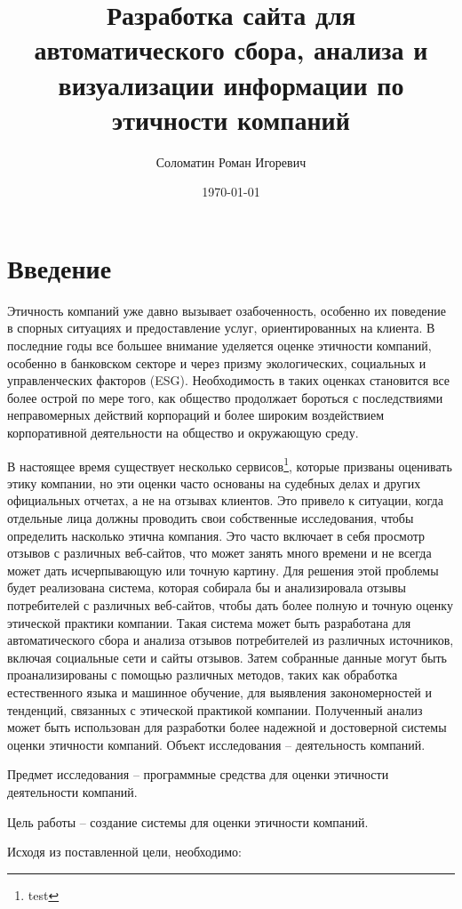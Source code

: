 \documentclass[PI, VKR]{HSEUniversity}
\author{Соломатин Роман Игоревич}
\date{\today}
\title{Разработка сайта для автоматического сбора, анализа и визуализации информации по этичности компаний}
\begin{document}
\maketitle

\chapter*{Введение}
\label{sec:org5986b54}
Этичность компаний уже давно вызывает озабоченность, особенно их поведение в спорных ситуациях и предоставление услуг, ориентированных на клиента. В последние годы все большее внимание уделяется оценке этичности компаний\autocite{mure_esg_2021}, особенно в банковском секторе и через призму экологических, социальных и управленческих факторов (ESG). Необходимость в таких оценках становится все более острой по мере того, как общество продолжает бороться с последствиями неправомерных действий корпораций и более широким воздействием корпоративной деятельности на общество и окружающую среду.

В настоящее время существует несколько сервисов\footnote{test}, которые призваны оценивать этику компании, но эти оценки часто основаны на судебных делах и других официальных отчетах, а не на отзывах клиентов. Это привело к ситуации, когда отдельные лица должны проводить свои собственные исследования, чтобы определить насколько этична компания. Это часто включает в себя просмотр отзывов с различных веб-сайтов, что может занять много времени и не всегда может дать исчерпывающую или точную картину.
Для решения этой проблемы будет реализована система, которая собирала бы и анализировала отзывы потребителей с различных веб-сайтов, чтобы дать более полную и точную оценку этической практики компании. Такая система может быть разработана для автоматического сбора и анализа отзывов потребителей из различных источников, включая социальные сети и сайты отзывов. Затем собранные данные могут быть проанализированы с помощью различных методов, таких как обработка естественного языка и машинное обучение, для выявления закономерностей и тенденций, связанных с этической практикой компании. Полученный анализ может быть использован для разработки более надежной и достоверной системы оценки этичности компаний.
Объект исследования – деятельность компаний.

Предмет исследования – программные средства для оценки этичности деятельности компаний.

Цель работы – создание системы для оценки этичности компаний.

Исходя из поставленной цели, необходимо:
\end{document}
